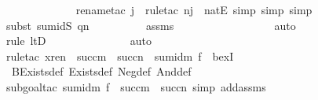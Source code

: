 \begin{isabellebody}
\ \ \ \ \ \ \ \ \ \ \ \ \isamarkupfalse%
{\isacharparenleft}{\kern0pt}rename{\isacharunderscore}{\kern0pt}tac\ j\ {\isasympsi}{\isacharcomma}{\kern0pt}\ rule{\isacharunderscore}{\kern0pt}tac\ n{\isacharequal}{\kern0pt}j\ \ natE{\isacharcomma}{\kern0pt}\ simp{\isacharcomma}{\kern0pt}\ simp{\isacharcomma}{\kern0pt}\ simp{\isacharparenright}{\kern0pt}\isanewline
\ \ \ \ \ \ \ \ \ \ \ \ \isamarkupfalse%
{\isacharparenleft}{\kern0pt}subst\ sum{\isacharunderscore}{\kern0pt}idS{\isacharbrackleft}{\kern0pt}\ q{\isacharequal}{\kern0pt}n{\isacharbrackright}{\kern0pt}{\isacharparenright}{\kern0pt}\isanewline
\ \ \ \ \ \ \ \ \isamarkupfalse%
\ assms{}\isanewline
\ \ \ \ \ \ \ \ \ \ \ \ \ \ \ \ \isamarkupfalse%
\ auto{\isacharbrackleft}{\kern0pt}{}{\isacharbrackright}{\kern0pt}\isanewline
\ \ \ \ \ \ \ \ \ \ \ \ \ \isamarkupfalse%
{\isacharparenleft}{\kern0pt}rule\ ltD{\isacharparenright}{\kern0pt}\isanewline
\ \ \ \ \ \ \ \ \ \ \ \ \ \isamarkupfalse%
\ auto{\isacharbrackleft}{\kern0pt}{}{\isacharbrackright}{\kern0pt}\isanewline
\ \ \ \ \ \ \ \ \ \ \ \isamarkupfalse%
{\isacharparenleft}{\kern0pt}rule{\isacharunderscore}{\kern0pt}tac\ x{\isacharequal}{\kern0pt}{\isachardoublequoteopen}ren{\isacharparenleft}{\kern0pt}{\isasympsi}{\isacharparenright}{\kern0pt}\ {\isacharbackquote}{\kern0pt}\ succ{\isacharparenleft}{\kern0pt}m{\isacharparenright}{\kern0pt}\ {\isacharbackquote}{\kern0pt}\ succ{\isacharparenleft}{\kern0pt}n{\isacharparenright}{\kern0pt}\ {\isacharbackquote}{\kern0pt}\ sum{\isacharunderscore}{\kern0pt}id{\isacharparenleft}{\kern0pt}m{\isacharcomma}{\kern0pt}\ f{\isacharparenright}{\kern0pt}{\isachardoublequoteclose}\ \ bexI{\isacharparenright}{\kern0pt}\isanewline
\ \ \ \ \ \ \ \ \isamarkupfalse%
\ BExists{\isacharprime}{\kern0pt}{\isacharunderscore}{\kern0pt}def\ Exists{\isacharunderscore}{\kern0pt}def\ Neg{\isacharunderscore}{\kern0pt}def\ And{\isacharunderscore}{\kern0pt}def\isanewline
\ \ \ \ \ \ \ \ \ \ \ \ \isamarkupfalse%
{\isacharparenleft}{\kern0pt}subgoal{\isacharunderscore}{\kern0pt}tac\ {\isachardoublequoteopen}sum{\isacharunderscore}{\kern0pt}id{\isacharparenleft}{\kern0pt}m{\isacharcomma}{\kern0pt}\ f{\isacharparenright}{\kern0pt}\ {\isasymin}\ succ{\isacharparenleft}{\kern0pt}m{\isacharparenright}{\kern0pt}\ {\isasymrightarrow}\ succ{\isacharparenleft}{\kern0pt}n{\isacharparenright}{\kern0pt}{\isachardoublequoteclose}{\isacharcomma}{\kern0pt}\ simp\ add{\isacharcolon}{\kern0pt}assms{}{\isacharparenright}{\kern0pt}\isanewline

\end{isabellebody}
